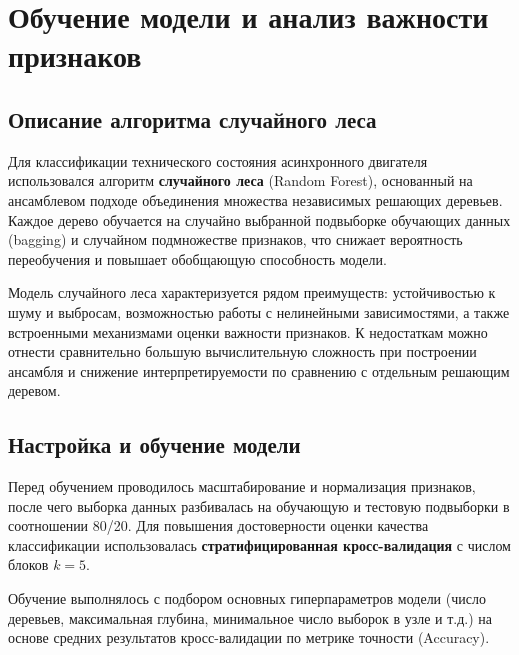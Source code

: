 \chapter{Обучение модели и анализ важности признаков}

\section{Описание алгоритма случайного леса}

Для классификации технического состояния асинхронного двигателя использовался алгоритм \textbf{случайного леса} (Random Forest), основанный на ансамблевом подходе объединения множества независимых решающих деревьев. Каждое дерево обучается на случайно выбранной подвыборке обучающих данных (bagging) и случайном подмножестве признаков, что снижает вероятность переобучения и повышает обобщающую способность модели.

Модель случайного леса характеризуется рядом преимуществ: устойчивостью к шуму и выбросам, возможностью работы с нелинейными зависимостями, а также встроенными механизмами оценки важности признаков. К недостаткам можно отнести сравнительно большую вычислительную сложность при построении ансамбля и снижение интерпретируемости по сравнению с отдельным решающим деревом.


\section{Настройка и обучение модели}

Перед обучением проводилось масштабирование и нормализация признаков, после чего выборка данных разбивалась на обучающую и тестовую подвыборки в соотношении 80/20.  
Для повышения достоверности оценки качества классификации использовалась \textbf{стратифицированная кросс-валидация} с числом блоков \( k = 5 \).

Обучение выполнялось с подбором основных гиперпараметров модели (число деревьев, максимальная глубина, минимальное число выборок в узле и т.д.) на основе средних результатов кросс-валидации по метрике точности (Accuracy).

